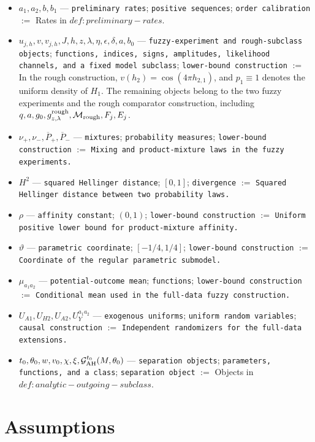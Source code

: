 \documentclass{article}
\begin{document}
\begin{itemize}
  \item \(a_1,a_2,b,b_1\) --- \texttt{preliminary rates}; \texttt{positive sequences}; \texttt{order calibration} $:=$ Rates in \(def:preliminary-rates\).
  \item \(u_{j,h},v,v_{j,h},J,h,z,\lambda,\eta,\epsilon,\delta,a,b_0\) --- \texttt{fuzzy-experiment and rough-subclass objects}; \texttt{functions, indices, signs, amplitudes, likelihood channels, and a fixed model subclass}; \texttt{lower-bound construction} $:=$ In the rough construction, \(v(h_2)=\cos(4\pi h_{2,1})\), and \(p_1\equiv1\) denotes the uniform density of \(H_1\). The remaining objects belong to the two fuzzy experiments and the rough comparator construction, including \(q,a,g_0,g^{\rm rough}_{z,\lambda},\mathcal M_{\rm rough},F_j,E_j\).
  \item \(\nu_+,\nu_-,\overline P_+,\overline P_-\) --- \texttt{mixtures}; \texttt{probability measures}; \texttt{lower-bound construction} $:=$ \texttt{Mixing and product-mixture laws in the fuzzy experiments.}
  \item \(H^2\) --- \texttt{squared Hellinger distance}; \([0,1]\); \texttt{divergence} $:=$ \texttt{Squared Hellinger distance between two probability laws.}
  \item \(\rho\) --- \texttt{affinity constant}; \((0,1)\); \texttt{lower-bound construction} $:=$ \texttt{Uniform positive lower bound for product-mixture affinity.}
  \item \(\vartheta\) --- \texttt{parametric coordinate}; \([-1/4,1/4]\); \texttt{lower-bound construction} $:=$ \texttt{Coordinate of the regular parametric submodel.}
  \item \(\mu_{a_1a_2}\) --- \texttt{potential-outcome mean}; \texttt{functions}; \texttt{lower-bound construction} $:=$ \texttt{Conditional mean used in the full-data fuzzy construction.}
  \item \(U_{A1},U_{H2},U_{A2},U_Y^{a_1a_2}\) --- \texttt{exogenous uniforms}; \texttt{uniform random variables}; \texttt{causal construction} $:=$ \texttt{Independent randomizers for the full-data extensions.}
  \item \(t_0,\theta_0,w,v_0,\chi,\xi,\mathcal G_{\rm AH}^{t_0}(M,\theta_0)\) --- \texttt{separation objects}; \texttt{parameters, functions, and a class}; \texttt{separation object} $:=$ Objects in \(def:analytic-outgoing-subclass\).
\end{itemize}

\section{Assumptions}
\end{document}
